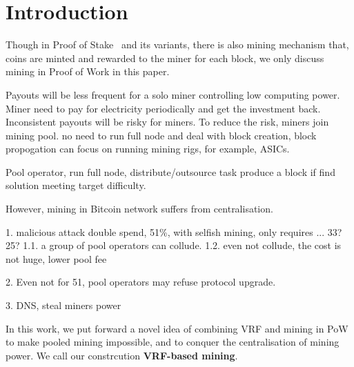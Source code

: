 \section{Introduction}


Though in Proof of Stake~\cite{} and its variants, there is also mining
mechanism that, coins are minted and rewarded to the miner for each block, we
only discuss mining in Proof of Work in this paper.


Payouts will be less frequent for a solo miner controlling low computing power.
Miner need to pay for electricity periodically and get the investment back.
Inconsistent payouts will be risky for miners.
To reduce the risk, miners join mining pool.
no need to run full node and deal with block creation, block propogation
can focus on running mining rigs, for example, ASICs.

Pool operator, run full node, distribute/outsource task
produce a block if find solution meeting target difficulty.

However, mining in Bitcoin network suffers from centralisation.




1. malicious attack
double spend, 51\%, with selfish mining, only requires ... 33?25?
1.1. a group of pool operators can collude.
1.2. even not collude, the cost is not huge, lower pool fee

2. Even not for 51, 
pool operators may refuse protocol upgrade. 


3. DNS, steal miners power


In this work, we put forward a novel idea of combining VRF and mining in PoW to make pooled mining impossible, and to conquer the centralisation of mining power.
We call our constrcution \textbf{VRF-based mining}.